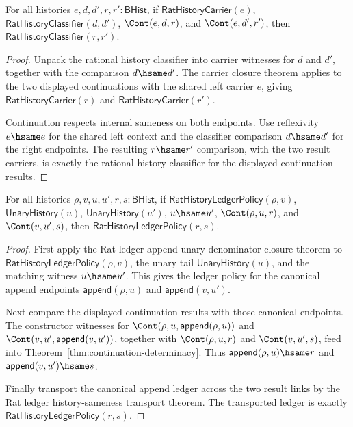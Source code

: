 \begin{theorem}
\label{thm:rat-history-classifier-continuation-left-closed}
For all histories $e,d,d',r,r':\mathsf{BHist}$, if
$\mathsf{RatHistoryCarrier}(e)$, $\mathsf{RatHistoryClassifier}(d,d')$,
$\Cont(e,d,r)$, and $\Cont(e,d',r')$, then
$\mathsf{RatHistoryClassifier}(r,r')$.
\end{theorem}
\begin{proof}
Unpack the rational history classifier into carrier witnesses for $d$ and
$d'$, together with the comparison $d\hsame d'$. The carrier closure theorem
applies to the two displayed continuations with the shared left carrier $e$,
giving $\mathsf{RatHistoryCarrier}(r)$ and
$\mathsf{RatHistoryCarrier}(r')$.

Continuation respects internal sameness on both endpoints. Use reflexivity
$e\hsame e$ for the shared left context and the classifier comparison
$d\hsame d'$ for the right endpoints. The resulting $r\hsame r'$ comparison,
with the two result carriers, is exactly the rational history classifier for
the displayed continuation results.
\end{proof}

\begin{theorem}
\label{thm:field-rat-denominator-continuation-ledger-closure}
For all histories $\rho,v,u,u',r,s:\mathsf{BHist}$, if
$\mathsf{RatHistoryLedgerPolicy}(\rho,v)$, $\mathsf{UnaryHistory}(u)$,
$\mathsf{UnaryHistory}(u')$, $u\hsame u'$, $\Cont(\rho,u,r)$, and
$\Cont(v,u',s)$, then $\mathsf{RatHistoryLedgerPolicy}(r,s)$.
\end{theorem}
\begin{proof}
First apply the Rat ledger append-unary denominator closure theorem to
$\mathsf{RatHistoryLedgerPolicy}(\rho,v)$, the unary tail
$\mathsf{UnaryHistory}(u)$, and the matching witness $u\hsame u'$. This gives
the ledger policy for the canonical append endpoints
$\mathsf{append}(\rho,u)$ and $\mathsf{append}(v,u')$.

Next compare the displayed continuation results with those canonical endpoints.
The constructor witnesses for $\Cont(\rho,u,\mathsf{append}(\rho,u))$ and
$\Cont(v,u',\mathsf{append}(v,u'))$, together with $\Cont(\rho,u,r)$ and
$\Cont(v,u',s)$, feed into Theorem~\ref{thm:continuation-determinacy}. Thus
$\mathsf{append}(\rho,u)\hsame r$ and
$\mathsf{append}(v,u')\hsame s$.

Finally transport the canonical append ledger across the two result links by
the Rat ledger history-sameness transport theorem. The transported ledger is
exactly $\mathsf{RatHistoryLedgerPolicy}(r,s)$.
\end{proof}

